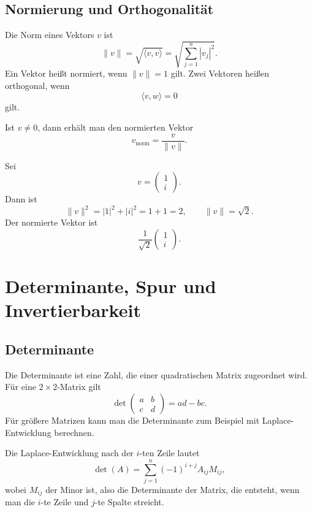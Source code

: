 \subsection{Normierung und Orthogonalität}

\begin{definitionbox}
Die Norm eines Vektors $v$ ist
\[
    \|v\| = \sqrt{\langle v,v\rangle}
    = \sqrt{\sum_{j=1}^{n}|v_j|^2}.
\]
Ein Vektor heißt normiert, wenn $\|v\|=1$ gilt.
Zwei Vektoren heißen orthogonal, wenn
\[
    \langle v,w\rangle=0
\]
gilt.
\end{definitionbox}

Ist $v\ne 0$, dann erhält man den normierten Vektor
\[
    v_{\mathrm{norm}}=\frac{v}{\|v\|}.
\]

\begin{examplebox}
Sei
\[
    v=\begin{pmatrix}1\\ i\end{pmatrix}.
\]
Dann ist
\[
    \|v\|^2 = |1|^2+|i|^2=1+1=2,
    \qquad \|v\|=\sqrt2.
\]
Der normierte Vektor ist
\[
    \frac{1}{\sqrt2}\begin{pmatrix}1\\ i\end{pmatrix}.
\]
\end{examplebox}

\section{Determinante, Spur und Invertierbarkeit}

\subsection{Determinante}

Die Determinante ist eine Zahl, die einer quadratischen Matrix zugeordnet wird. Für eine $2\times2$-Matrix gilt
\[
    \det\begin{pmatrix}a&b\\c&d\end{pmatrix}=ad-bc.
\]
Für größere Matrizen kann man die Determinante zum Beispiel mit Laplace-Entwicklung berechnen.

\begin{formulabox}
Die Laplace-Entwicklung nach der $i$-ten Zeile lautet
\[
    \det(A)=\sum_{j=1}^{n}(-1)^{i+j}A_{ij}M_{ij},
\]
wobei $M_{ij}$ der Minor ist, also die Determinante der Matrix, die entsteht, wenn man die $i$-te Zeile und $j$-te Spalte streicht.
\end{formulabox}


